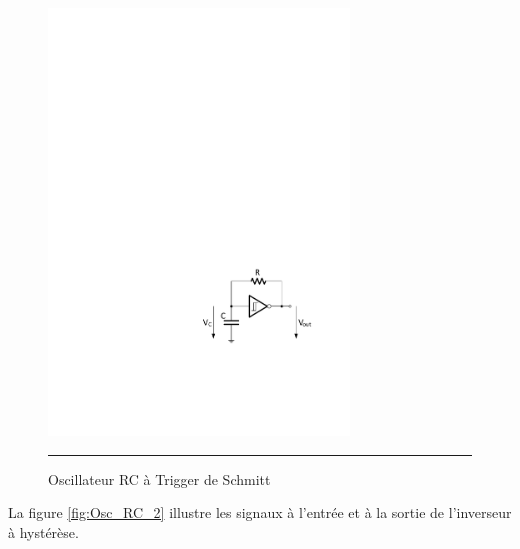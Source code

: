 \begin{figure}[htb]
  \centering
  \includegraphics [angle=0, width=8cm]{./Figures/Chap6_Horloges/Osc_RC_1.pdf}
  \rule{35em}{0.5pt}
  \caption{Oscillateur RC à Trigger de Schmitt}
  \label{fig:Osc_RC_1}
\end{figure}

La figure \ref{fig:Osc_RC_2} illustre les signaux à l'entrée et à la sortie de l'inverseur à hystérèse.

